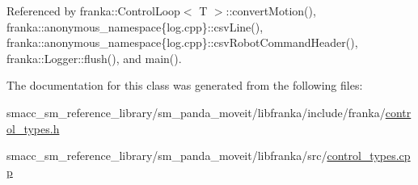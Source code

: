 Referenced by franka\+::\+Control\+Loop$<$ T $>$\+::convert\+Motion(), franka\+::anonymous\+\_\+namespace\{log.\+cpp\}\+::csv\+Line(), franka\+::anonymous\+\_\+namespace\{log.\+cpp\}\+::csv\+Robot\+Command\+Header(), franka\+::\+Logger\+::flush(), and main().



The documentation for this class was generated from the following files\+:\begin{DoxyCompactItemize}
\item 
smacc\+\_\+sm\+\_\+reference\+\_\+library/sm\+\_\+panda\+\_\+moveit/libfranka/include/franka/\hyperlink{control__types_8h}{control\+\_\+types.\+h}\item 
smacc\+\_\+sm\+\_\+reference\+\_\+library/sm\+\_\+panda\+\_\+moveit/libfranka/src/\hyperlink{control__types_8cpp}{control\+\_\+types.\+cpp}\end{DoxyCompactItemize}
